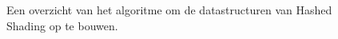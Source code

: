\begin{figure}[tp]
\begin{adjustbox}{minipage=\textwidth, scale=0.6}
\begin{tikzpicture}[node distance=1.5cm
    every node/.style={fill=white}, align=center]
\end{tikzpicture}
\end{adjustbox}
  \caption{Een overzicht van het algoritme om de datastructuren van Hashed Shading op te bouwen.}
  \label{fig:hs-algoritme-beschrijving}
\end{figure}

